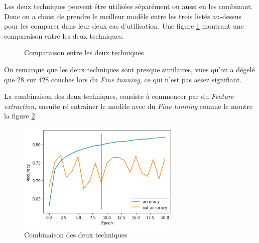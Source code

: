\documentclass[12pt,titlepage]{article}
\begin{document}
Les deux techniques peuvent être utilisées séparément ou aussi en les combinant. Donc on a choisi de prendre le meilleur modèle entre les trois listés au-dessus pour les comparer dans leur deux cas d'utilisation. Une figure \ref{compare_tech} montrant une comparaison entre les deux techniques.


\begin{figure}[]
\qquad
{}
\caption{Comparaison entre les deux techniques}
\label{compare_tech}

\end{figure}

On remarque que les deux techniques sont presque similaires, vues qu'on a dégelé que 28 sur 428 couches lors du \textit{Fine tunning}, ce qui n'est pas assez signifiant.

La combinaison des deux techniques, consiste à commencer par du \textit{Feature extraction}, ensuite ré entraîner le modèle avec du \textit{Fine tunning} comme le montre la figure \ref{ensemble}

\begin{figure}[!h]
\centering
\includegraphics[width=0.7\textwidth]{img/combined_ft_extract_fine_tun/acc.png}
\caption{Combinaison des deux techniques}
\label{ensemble}
\end{figure}
\end{document}
